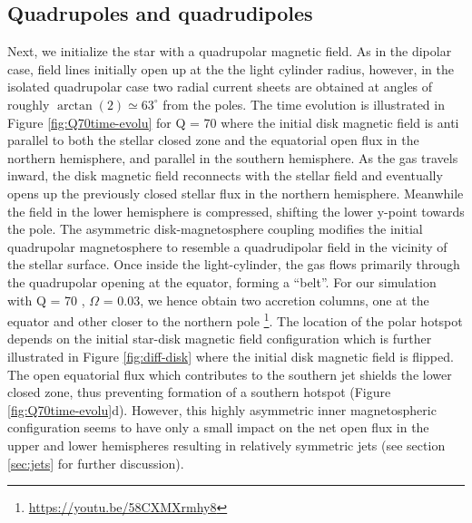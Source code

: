 \documentclass[fleqn,usenatbib]{mnras}
\begin{document}
\subsection{Quadrupoles and quadrudipoles}\label{sec:quadrupoles}
\begin{figure*}
   \centering
    \caption{Evolution of the disk in presence of a pure quadrupole with Q = 70, rotating at $\Omega=0.03$. The different panels represent logarithmic density profiles at different snapshots. All the labels are same as in Figure \ref{fig:diffmudipole}.}%
    \label{fig:Q70time-evolu}
\end{figure*}
Next, we initialize the star with a quadrupolar magnetic field. 
As in the dipolar case, field lines initially open up at the the light cylinder radius, however, in the isolated quadrupolar case two radial current sheets are obtained at angles of roughly $\arctan(2)\simeq 63^\circ$ from the poles. The time evolution is illustrated in Figure \ref{fig:Q70time-evolu} for Q = 70 where the initial disk magnetic field is anti parallel to both the stellar closed zone and the equatorial open flux in the northern hemisphere, and parallel in the southern hemisphere. As the gas travels inward, the disk magnetic field reconnects with the stellar field and eventually opens up the previously closed stellar flux in the northern hemisphere. Meanwhile the field in the lower hemisphere is compressed, shifting the lower y-point towards the pole. The asymmetric disk-magnetosphere coupling modifies the initial quadrupolar magnetosphere to resemble a quadrudipolar field in the vicinity of the stellar surface. Once inside the light-cylinder, the gas flows primarily through the quadrupolar opening at the equator, forming a ``belt''. For our simulation with Q = 70 , $\Omega$ = 0.03, we hence obtain two accretion columns, one at the equator and other closer to the northern pole \footnote{\url{https://youtu.be/58CXMXrmhy8}}. The location of the polar hotspot depends on the initial star-disk magnetic field configuration which is further illustrated in Figure \ref{fig:diff-disk} where the initial disk magnetic field is flipped. 
The open equatorial flux which contributes to the southern jet shields the lower closed zone, thus preventing formation of a southern hotspot (Figure \ref{fig:Q70time-evolu}d). However, this highly asymmetric inner magnetospheric configuration seems to have only a small impact on the net open flux in the upper and lower hemispheres resulting in relatively symmetric jets (see section \ref{sec:jets} for further discussion).  
\end{document}
